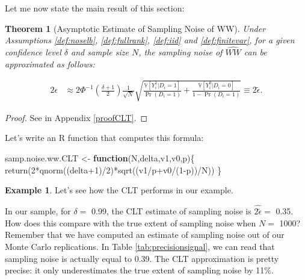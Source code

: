 \documentclass[
]{book}
\newenvironment{Shaded}{\begin{snugshade}}{\end{snugshade}}
\newcommand{\ControlFlowTok}[1]{\textcolor[rgb]{0.13,0.29,0.53}{\textbf{#1}}}
\newcommand{\DecValTok}[1]{\textcolor[rgb]{0.00,0.00,0.81}{#1}}
\newcommand{\FunctionTok}[1]{\textcolor[rgb]{0.00,0.00,0.00}{#1}}
\newcommand{\NormalTok}[1]{#1}
\newcommand{\OtherTok}[1]{\textcolor[rgb]{0.56,0.35,0.01}{#1}}
\newcommand{\SpecialCharTok}[1]{\textcolor[rgb]{0.00,0.00,0.00}{#1}}
\newcommand{\var}[1]{\mathbb{V}[ #1 ]}
\newtheorem{theorem}{Theorem}[chapter]
\theoremstyle{definition}
\theoremstyle{definition}
\newtheorem{example}{Example}[chapter]
\theoremstyle{definition}
\theoremstyle{definition}
\theoremstyle{remark}
\begin{document}
Let me now state the main result of this section:

\begin{theorem}[Asymptotic Estimate of Sampling Noise of WW]
\protect\hypertarget{thm:asympnoiseWW}{}{\label{thm:asympnoiseWW} \iffalse (Asymptotic Estimate of Sampling Noise of WW) \fi{} }Under Assumptions \ref{def:noselb}, \ref{def:fullrank}, \ref{def:iid} and \ref{def:finitevar}, for a given confidence level \(\delta\) and sample size \(N\), the sampling noise of \(\hat{WW}\) can be approximated as follows:

\begin{align*}
2\epsilon & \approx 2\Phi^{-1}\left(\frac{\delta+1}{2}\right)\frac{1}{\sqrt{N}}\sqrt{\frac{\var{Y_i^1|D_i=1}}{\Pr(D_i=1)}+\frac{\var{Y_i^0|D_i=0}}{1-\Pr(D_i=1)}} \equiv 2\tilde{\epsilon}.
\end{align*}
\end{theorem}

\begin{proof}
\iffalse{} {Proof. } \fi{}See in Appendix \ref{proofCLT}.
\end{proof}

Let's write an R function that computes this formula:

\begin{Shaded}
\begin{Highlighting}[]
\NormalTok{samp.noise.ww.CLT }\OtherTok{\textless{}{-}} \ControlFlowTok{function}\NormalTok{(N,delta,v1,v0,p)\{}
  \FunctionTok{return}\NormalTok{(}\DecValTok{2}\SpecialCharTok{*}\FunctionTok{qnorm}\NormalTok{((delta}\SpecialCharTok{+}\DecValTok{1}\NormalTok{)}\SpecialCharTok{/}\DecValTok{2}\NormalTok{)}\SpecialCharTok{*}\FunctionTok{sqrt}\NormalTok{((v1}\SpecialCharTok{/}\NormalTok{p}\SpecialCharTok{+}\NormalTok{v0}\SpecialCharTok{/}\NormalTok{(}\DecValTok{1}\SpecialCharTok{{-}}\NormalTok{p))}\SpecialCharTok{/}\NormalTok{N))}
\NormalTok{\}}
\end{Highlighting}
\end{Shaded}

\begin{example}
\protect\hypertarget{exm:unnamed-chunk-49}{}{\label{exm:unnamed-chunk-49} }Let's see how the CLT performs in our example.
\end{example}
In our sample, for \(\delta=\) 0.99, the CLT estimate of sampling noise is \(\hat{2\tilde{\epsilon}}=\) 0.35.
How does this compare with the true extent of sampling noise when \(N=\) 1000?
Remember that we have computed an estimate of sampling noise out of our Monte Carlo replications.
In Table \ref{tab:precisionsignal}, we can read that sampling noise is actually equal to 0.39.
The CLT approximation is pretty precise: it only underestimates the true extent of sampling noise by 11\%.
\end{document}
